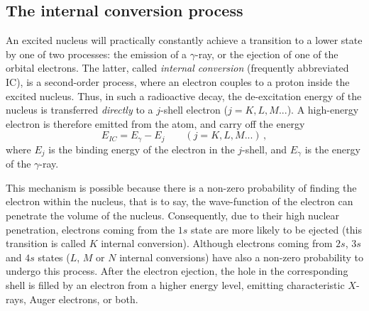 \subsection{The internal conversion process}

An excited nucleus will practically constantly achieve a transition to a lower state by one of two processes: the emission of a $\gamma$-ray, or the ejection of one of the orbital electrons.
The latter, called \emph{internal conversion} (frequently abbreviated IC), is a second-order process, where an electron couples to a proton inside the excited nucleus.
Thus, in such a radioactive decay, the de-excitation energy of the nucleus is transferred \emph{directly} to a $j$-shell electron ($j=K,L,M...$).
A high-energy electron is therefore emitted from the atom, and carry off the energy
\begin{equation}
E_{IC} = E_{\gamma}-E_{j}\qquad (j=K,L,M...)\,,
\end{equation}
where $E_{j}$ is the binding energy of the electron in the $j$-shell, and $E_{\gamma}$ is the energy of the $\gamma$-ray.

This mechanism is possible because there is a non-zero probability of finding the electron within the nucleus, that is to say, the wave-function of the electron can penetrate the volume of the nucleus.
Consequently, due to their high nuclear penetration, electrons coming from the $1s$ state are more likely to be ejected (this transition is called $K$ internal conversion).
Although electrons coming from $2s$, $3s$ and $4s$ states ($L$, $M$ or $N$ internal conversions) have also a non-zero probability to undergo this process.
After the electron ejection, the hole in the corresponding shell is filled by an electron from a higher energy level, emitting characteristic $X$-rays, Auger electrons, or both.

